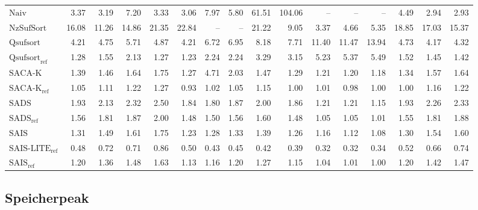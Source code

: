 \begin{table}
{\begin{tabular}{lrrrrrrrrrrrrrrr}
    $\text{Naiv}$ & 3.37 & 3.19 & 7.20 & 3.33 & 3.06 & 7.97 & 5.80 & {\color{red}61.51} & {\color{red}104.06} & {\color{darkgray}--} & {\color{darkgray}--} & {\color{darkgray}--} & 4.49 & 2.94 & 2.93 \\
    $\text{NzSufSort}$ & {\color{red}16.08} & {\color{red}11.26} & {\color{red}14.86} & {\color{red}21.35} & {\color{red}22.84} & {\color{darkgray}--} & {\color{darkgray}--} & {\color{red}21.22} & 9.05 & 3.37 & 4.66 & 5.35 & {\color{red}18.85} & {\color{red}17.03} & {\color{red}15.37} \\
    $\text{Qsufsort}$ & 4.21 & 4.75 & 5.71 & 4.87 & 4.21 & 6.72 & 6.95 & 8.18 & 7.71 & 11.40 & {\color{red}11.47} & {\color{red}13.94} & 4.73 & 4.17 & 4.32 \\
    $\text{Qsufsort}_{\text{ref}}$ & 1.28 & 1.55 & 2.13 & 1.27 & 1.23 & 2.24 & 2.24 & 3.29 & 3.15 & 5.23 & 5.37 & 5.49 & 1.52 & 1.45 & 1.42 \\
    $\text{SACA-K}$ & 1.39 & 1.46 & 1.64 & 1.75 & 1.27 & 4.71 & 2.03 & 1.47 & 1.29 & 1.21 & 1.20 & 1.18 & 1.34 & 1.57 & 1.64 \\
    $\text{SACA-K}_{\text{ref}}$ & 1.05 & 1.11 & 1.22 & 1.27 & 0.93 & 1.02 & 1.05 & 1.15 & 1.00 & 1.01 & 0.98 & 1.00 & 1.00 & 1.16 & 1.22 \\
    $\text{SADS}$ & 1.93 & 2.13 & 2.32 & 2.50 & 1.84 & 1.80 & 1.87 & 2.00 & 1.86 & 1.21 & 1.21 & 1.15 & 1.93 & 2.26 & 2.33 \\
    $\text{SADS}_{\text{ref}}$ & 1.56 & 1.81 & 1.87 & 2.00 & 1.48 & 1.50 & 1.56 & 1.60 & 1.48 & 1.05 & 1.05 & 1.01 & 1.55 & 1.81 & 1.88 \\
    $\text{SAIS}$ & 1.31 & 1.49 & 1.61 & 1.75 & 1.23 & 1.28 & 1.33 & 1.39 & 1.26 & 1.16 & 1.12 & 1.08 & 1.30 & 1.54 & 1.60 \\
    $\text{SAIS-LITE}_{\text{ref}}$ & {\color{green!60!black}0.48} & 0.72 & 0.71 & 0.86 & 0.50 & {\color{green!60!black}0.43} & {\color{green!60!black}0.45} & {\color{green!60!black}0.42} & {\color{green!60!black}0.39} & {\color{green!60!black}0.32} & {\color{green!60!black}0.32} & {\color{green!60!black}0.34} & {\color{green!60!black}0.52} & 0.66 & 0.74 \\
    $\text{SAIS}_{\text{ref}}$ & 1.20 & 1.36 & 1.48 & 1.63 & 1.13 & 1.16 & 1.20 & 1.27 & 1.15 & 1.04 & 1.01 & 1.00 & 1.20 & 1.42 & 1.47 \\
\bottomrule
\end{tabular}
}
\end{table}

\subsection{Speicherpeak}

